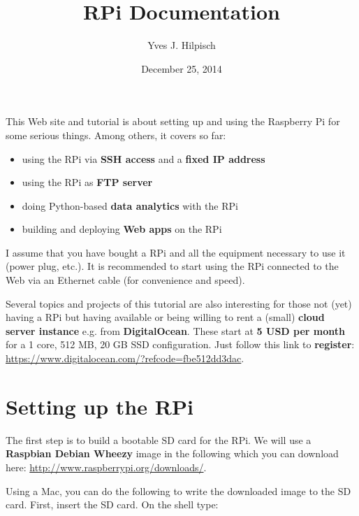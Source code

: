 \documentclass[letterpaper,10pt,english]{sphinxmanual}
\title{RPi Documentation}
\date{December 25, 2014}
\author{Yves J. Hilpisch}
\begin{document}
\maketitle
\tableofcontents
{}\label{index::doc}


This Web site and tutorial is about setting up and using the Raspberry Pi for some serious things. Among others, it covers so far:
\begin{itemize}
\item {} 
using the RPi via \textbf{SSH access} and a \textbf{fixed IP address}

\item {} 
using the RPi as \textbf{FTP server}

\item {} 
doing Python-based \textbf{data analytics} with the RPi

\item {} 
building and deploying \textbf{Web apps} on the RPi

\end{itemize}

I assume that you have bought a RPi and all the equipment necessary to use it (power plug, etc.). It is recommended to start using the RPi connected to the Web via an Ethernet cable (for convenience and speed).

Several topics and projects of this tutorial are also interesting for those not (yet) having a RPi but having available or being willing to rent a (small) \textbf{cloud server instance} e.g. from \textbf{DigitalOcean}. These start at \textbf{5 USD per month} for a 1 core, 512 MB, 20 GB SSD configuration. Just follow this link to \textbf{register}: \href{https://www.digitalocean.com/?refcode=fbe512dd3dac}{https://www.digitalocean.com/?refcode=fbe512dd3dac}.


\chapter{Setting up the RPi}
\label{index:raspberry-pi-for-serious-things}\label{index:setting-up-the-rpi}
The first step is to build a bootable SD card for the RPi. We will use a \textbf{Raspbian Debian Wheezy} image in the  following which you can download here: \href{http://www.raspberrypi.org/downloads/}{http://www.raspberrypi.org/downloads/}.

Using a Mac, you can do the following to write the downloaded image to the  SD card. First, insert the SD card. On the shell type:
\end{document}

